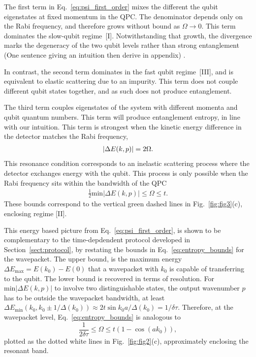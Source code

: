\documentclass[10pt,
 amsmath,amssymb,
 aps,prb, twocolumn
]{revtex4-2}
\newcommand\sj[1]{ {\color{cyan} #1} }
\newcommand\del[1]{ {\color{orange} #1} }
\begin{document}
The first term in Eq.~\eqref{eq:psi_first_order} mixes the different the qubit eigenstates at fixed momentum in the QPC. The denominator depends only on the Rabi frequency, and therefore grows without bound as \mbox{$\Omega\rightarrow0$}. This term dominates the slow-qubit regime~[I].
\del{Notwithstanding that growth, the divergence marks the degeneracy of the two
qubit levels rather than strong entanglement \sj{(One sentence giving an intuition then derive in appendix)}.}

In contrast, the second term dominates in the fast qubit regime~[III], and is equivalent to elastic scattering due to an impurity. This term does not couple different qubit states together, and as such does not produce entanglement.

The third term couples eigenstates of the system with different momenta and qubit quantum numbers. This term will produce entanglement entropy, in line with our intuition. This term is strongest when the kinetic energy difference in the detector matches the Rabi frequency, 
\begin{align}\label{eq:resonance_condition}
   \abs{\Delta E(k,p)}= 2 \Omega. 
\end{align}
This resonance condition corresponds to an inelastic scattering process where the detector exchanges energy with the qubit. This process is only possible when the Rabi frequency sits within the bandwidth of the QPC
\begin{align}\label{eq:entropy_bounds}
    \frac{1}{2} \text{min}|\Delta E(k,p)| \leq \Omega \leq t.
\end{align}
These bounds correspond to the vertical green dashed lines in Fig.~\ref{fig:fig3}(c), enclosing regime [II]. 

\sj{This energy based picture from Eq.~\eqref{eq:psi_first_order}, is shown to be complementary to the time-depdendent protocol developed in Section~\ref{sect:protocol}, by restating the bounds in Eq.~\eqref{eq:entropy_bounds} for the wavepacket. The upper bound, is the maximum energy \mbox{$\Delta E_{\text{max}} = E(k_0)-E(0)$} that a wavepacket with $k_0$ is capable of transferring to the qubit. The lower bound is recovered in terms of resolution. For \mbox{$\text{min}|\Delta E(k,p)|$} to involve two distinguishable states, the output wavenumber $p$ has to be outside the wavepacket bandwidth, at least \mbox{$\Delta E_{\text{min}}(k_0,k_0\pm 1/\Delta (k_0)) \approx 2t\sin{k_0 a}/\Delta(k_0) = 1/\delta \tau$}. Therefore, at the wavepacket level, Eq.~\eqref{eq:entropy_bounds} is analogous to
\begin{equation}\label{eq:k0_bounds}
    \frac{1}{2\delta\tau}\leq \Omega\leq t(1-\cos(ak_0)),
\end{equation}
plotted as the dotted white lines in Fig.~\ref{fig:fig2}(c), approximately enclosing the resonant band.}
\end{document}
